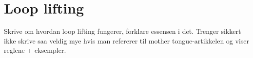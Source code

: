 \section{Loop lifting}
\label{sect:method:loop_lifting}
Skrive om hvordan loop lifting fungerer, forklare essensen i det. Trenger
sikkert ikke skrive saa veldig mye hvis man refererer til mother
tongue-artikkelen og viser reglene + eksempler. 
